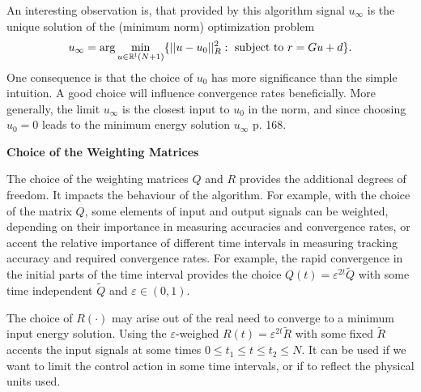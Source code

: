 


An interesting observation is, that provided by this algorithm signal $u_\infty$ is the unique solution of the (minimum norm) optimization problem 
\begin{align}
u_\infty = \arg \min_{u \in {\mathbb{R}}^l(N+1)} \{|| u - u_0||_R^2: \text{ subject to } r = Gu + d\}.
\end{align}
One consequence is that the choice of $u_0$ has more significance than the simple intuition. A good choice will influence convergence rates beneficially. More generally, the limit $u_\infty$ is the closest input to $u_0$ in the norm, and since choosing $u_0 = 0$ leads to the minimum energy solution $u_\infty$ \cite[p.\~ 168]{ILC} p. 168. 

\leer


\textbf{Choice of the Weighting Matrices}

The choice of the weighting matrices $Q$ and $R$ provides the additional degrees of freedom. 
It impacts the behaviour of the algorithm. For example, with the choice of the matrix $Q$, some elements of input and output signals can be weighted, depending on their importance in measuring accuracies and convergence rates, or accent the relative importance of different time intervals in measuring tracking accuracy and required convergence rates. For example, the rapid convergence in the initial parts of the time interval provides the choice $Q(t) = \varepsilon^{2t}\tilde{Q}$ with some time independent $\tilde{Q}$ and $\varepsilon \in (0,1)$. 

The choice of $R(\cdot)$ may arise out of the real need to converge to a minimum input energy solution. 
Using the $\varepsilon$-weighed $R(t) = \varepsilon^{2t}\tilde{R}$ with some fixed $\tilde{R}$  accents the input signals at some times $0\leq t_1 \leq t \leq t_2 \leq N$. It can be used if we want to limit the control action in some time intervals, or if to reflect the physical units used. 

